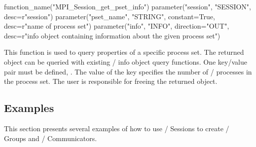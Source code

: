 \begin{mpi-binding}
    function_name("MPI_Session_get_pset_info")
    parameter("session", "SESSION", desc=r"session")
    parameter("pset_name", "STRING", constant=True, desc=r"name of process set")
    parameter("info", "INFO", direction="OUT", desc=r"info object containing information about the given process set")
\end{mpi-binding}

This function is used to query properties of a specific process set.
The returned  object can be queried with existing \MPI/ info object query functions.
One key/value pair must be defined, .
The value of the  key specifies the number of \MPI/ processes in the process set.
The user is responsible for freeing the returned  object.

\subsection{\texorpdfstring{\spm}{Sessions Model} Examples}

This section presents several examples of how to use \MPI/ Sessions to create \MPI/ Groups and \MPI/ Communicators.

